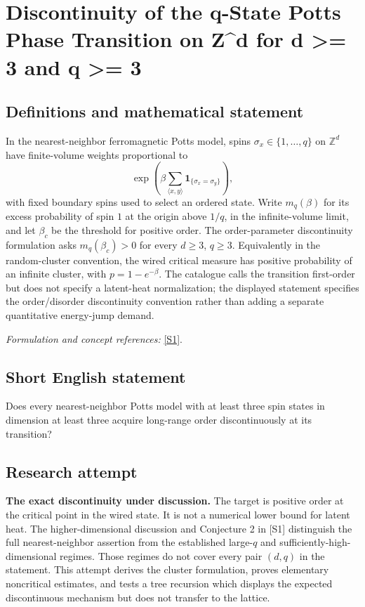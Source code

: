 \documentclass[11pt]{article}
\begin{document}
\section*{\texorpdfstring{Discontinuity of the q-State Potts Phase Transition on Z\textasciicircum{}d for d >= 3 and q >= 3}{Discontinuity of the q-State Potts Phase Transition on Z\textasciicircum{}d for d >= 3 and q >= 3}}\label{30006867}
\subsection{Definitions and mathematical statement}
In the nearest-neighbor ferromagnetic Potts model, spins $\sigma_x\in\{1,\ldots,q\}$ on ${\mathbb{Z}}^d$ have finite-volume weights proportional to
\[
 \exp\!\left(\beta\sum_{\langle x,y\rangle}
 \mathbf1_{\{\sigma_x=\sigma_y\}}\right),
\]
with fixed boundary spins used to select an ordered state. Write $m_q(\beta)$ for its excess probability of spin $1$ at the origin above $1/q$, in the infinite-volume limit, and let $\beta_c$ be the threshold for positive order. The order-parameter discontinuity formulation asks $m_q(\beta_c)>0$ for every $d\ge3$, $q\ge3$. Equivalently in the random-cluster convention, the wired critical measure has positive probability of an infinite cluster, with $p=1-e^{-\beta}$. The catalogue calls the transition first-order but does not specify a latent-heat normalization; the displayed statement specifies the order/disorder discontinuity convention rather than adding a separate quantitative energy-jump demand.
\par\smallskip\textit{Formulation and concept references:} \href{https://ar5iv.labs.arxiv.org/html/1707.00520}{[S1]}.

\subsection{Short English statement}
Does every nearest-neighbor Potts model with at least three spin states in dimension at least three acquire long-range order discontinuously at its transition?
\subsection{Research attempt}
\textbf{The exact discontinuity under discussion.}
The target is positive order at the critical point in the wired state.  It is
not a numerical lower bound for latent heat.  The higher-dimensional discussion
and Conjecture 2 in [S1] distinguish the full nearest-neighbor assertion from
the established large-$q$ and sufficiently-high-dimensional regimes.  Those
regimes do not cover every pair $(d,q)$ in the statement.  This attempt derives
the cluster formulation, proves elementary noncritical estimates, and tests a
tree recursion which displays the expected discontinuous mechanism but does
not transfer to the lattice.
\end{document}
